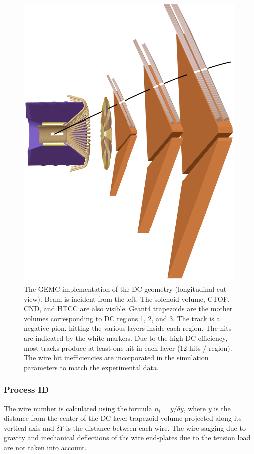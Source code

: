 \begin{figure}[h]
	\centering
	\includegraphics[width=0.99\columnwidth,keepaspectratio]{img/dcGeometry.png}
	\caption{The GEMC implementation of the DC geometry (longitudinal cut-view).
	         Beam is incident from the left. The solenoid volume, CTOF, CND, and HTCC are also visible.
             Geant4 trapezoids are the mother volumes corresponding to DC regions 1, 2, and 3.
             The track is a negative pion, hitting the various layers inside each region.
             The hits are indicated by the white markers. Due to the high DC
             efficiency, most tracks produce at least one hit in each layer (12 hits / region).
             The wire hit inefficiencies are incorporated in the simulation parameters to match the experimental data.}
	\label{fig:dcGeometry}
\end{figure}


\subsubsection{Process ID}
The wire number is calculated using the formula $n_i = y / \delta y$, where $y$ is the
distance from the center of the DC layer trapezoid volume projected along its vertical axis and $\delta Y$
is the distance between each wire.
The wire sagging due to gravity and mechanical deflections of the wire end-plates due to the tension
load are not taken into account.

